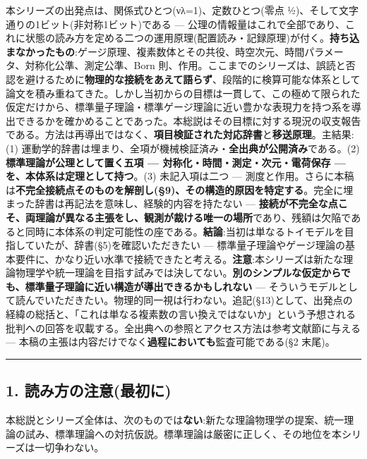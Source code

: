 \documentclass[
]{ltjsarticle}
\begin{document}
本シリーズの出発点は、関係式ひとつ(νλ=1)、定数ひとつ(零点
½)、そして文字通りの1ビット(非対称1ビット)である ---
公理の情報量はこれで全部であり、これに状態の読み方を定める二つの運用原理(配置読み・記録原理)が付く。\textbf{持ち込まなかったもの}:ゲージ原理、複素数体とその共役、時空次元、時間パラメータ、対称化公準、測定公準、Born
則、作用。ここまでのシリーズは、誤読と否認を避けるために\textbf{物理的な接続をあえて語らず}、段階的に検算可能な体系として論文を積み重ねてきた。しかし当初からの目標は一貫して、この極めて限られた仮定だけから、標準量子理論・標準ゲージ理論に近い豊かな表現力を持つ系を導出できるかを確かめることであった。本総説はその目標に対する現況の収支報告である。方法は再導出ではなく、\textbf{項目検証された対応辞書}と\textbf{移送原理}。主結果:(1)
運動学的辞書は埋まり、全項が機械検証済み・\textbf{全出典が公開済み}である。(2)
\textbf{標準理論が公理として置く五項 ---
対称化・時間・測定・次元・電荷保存 --- を、本体系は定理として持つ}。(3)
未記入項は二つ ---
測度と作用。さらに本稿は\textbf{不完全接続点そのものを解剖し(§9)、その構造的原因を特定する}。完全に埋まった辞書は再記法を意味し、経験的内容を持たない
---
\textbf{接続が不完全な点こそ、両理論が異なる主張をし、観測が裁ける唯一の場所}であり、残額は欠陥であると同時に本体系の判定可能性の座である。\textbf{結論}:当初は単なるトイモデルを目指していたが、辞書(§5)を確認いただきたい
---
標準量子理論やゲージ理論の基本要件に、かなり近い水準で接続できたと考える。\textbf{注意}:本シリーズは新たな理論物理学や統一理論を目指す試みでは決してない。\textbf{別のシンプルな仮定からでも、標準量子理論に近い構造が導出できるかもしれない}
---
そういうモデルとして読んでいただきたい。物理的同一視は行わない。追記(§13)として、出発点の経緯の総括と、「これは単なる複素数の言い換えではないか」という予想される批判への回答を収載する。全出典への参照とアクセス方法は参考文献節に与える
--- 本稿の主張は内容だけでなく\textbf{過程においても}監査可能である(§2
末尾)。

\begin{center}\rule{0.5\linewidth}{0.5pt}\end{center}

\subsection{1.
読み方の注意(最初に)}\label{ux8aadux307fux65b9ux306eux6ce8ux610fux6700ux521dux306b}

本総説とシリーズ全体は、次のものでは\textbf{ない}:新たな理論物理学の提案、統一理論の試み、標準理論への対抗仮説。標準理論は厳密に正しく、その地位を本シリーズは一切争わない。
\end{document}
